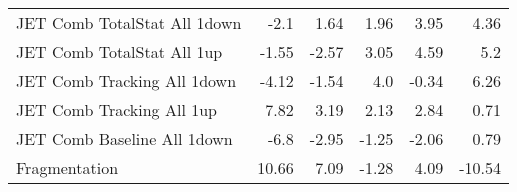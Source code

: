 \begin{table}[htbp]
{\begin{tabular}{lrrrrr}
JET Comb TotalStat All  1down                    & -2.1              & 1.64   & 1.96  & 3.95  & 4.36   \\
JET Comb TotalStat All  1up                      & -1.55             & -2.57  & 3.05  & 4.59  & 5.2    \\
JET Comb Tracking All  1down                     & -4.12             & -1.54  & 4.0   & -0.34 & 6.26   \\
JET Comb Tracking All  1up                       & 7.82              & 3.19   & 2.13  & 2.84  & 0.71   \\
JET Comb Baseline All  1down                     & -6.8              & -2.95  & -1.25 & -2.06 & 0.79   \\
Fragmentation                                                & 10.66             & 7.09   & -1.28 & 4.09  & -10.54 \\
\end{tabular}}
\end{table}



